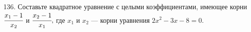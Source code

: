 136. Составьте квадратное уравнение с целыми коэффициентами, имеющее корни $\cfrac{x_1-1}{x_2}$ и $\cfrac{x_2-1}{x_1},$ где $x_1$ и $x_2$ --- корни уравнения $2x^2-3x-8=0.$\\
